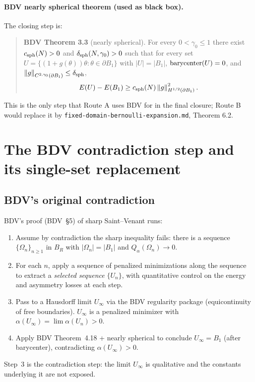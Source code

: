 \documentclass[11pt]{article}
\theoremstyle{definition}
\newcommand{\norm}[1]{\left\|#1\right\|}
\newcommand{\abs}[1]{\left|#1\right|}
\begin{document}
\paragraph{BDV nearly spherical theorem (used as black box).}
The closing step is:
\begin{quote}
\textbf{BDV Theorem 3.3} (nearly spherical). For every $0<\gamma_0\le1$
there exist $c_{\rm sph}(N)>0$ and $\delta_{\rm sph}(N,\gamma_0)>0$ such that for every set
$U=\{(1+g(\theta))\theta:\theta\in\partial B_1\}$ with
$\abs{U}=\abs{B_1}$, $\hbox{barycenter}(U)=0$, and
$\norm{g}_{C^{2,\gamma_0}(\partial B_1)}\le\delta_{\rm sph}$,
\[
E(U)-E(B_1)\ge c_{\rm sph}(N)\norm{g}_{H^{1/2}(\partial B_1)}^2.
\]
\end{quote}
This is the only step that Route A uses BDV for in the final closure; Route B
would replace it by \texttt{fixed-domain-bernoulli-expansion.md}, Theorem 6.2.

\section{The BDV contradiction step and its single-set replacement}

\subsection{BDV's original contradiction}

BDV's proof (BDV~\S 5) of sharp Saint--Venant runs:
\begin{enumerate}
\item Assume by contradiction the sharp inequality fails: there is a
sequence $\{\Omega_n\}_{n\ge1}$ in $B_R$ with $\abs{\Omega_n}=\abs{B_1}$ and
\(Q_\alpha(\Omega_n)\to 0\).
\item For each $n$, apply a sequence of penalized minimizations along the
sequence to extract a \emph{selected sequence} $\{U_n\}$, with quantitative
control on the energy and asymmetry losses at each step.
\item Pass to a Hausdorff limit $U_\infty$ via the BDV regularity package
(equicontinuity of free boundaries). $U_\infty$ is a penalized minimizer
with $\alpha(U_\infty)=\lim\alpha(U_n)>0$.
\item Apply BDV Theorem~4.18 + nearly spherical to conclude $U_\infty=B_1$
(after barycenter), contradicting $\alpha(U_\infty)>0$.
\end{enumerate}

Step~3 is the contradiction step: the limit $U_\infty$ is qualitative and
the constants underlying it are not exposed.
\end{document}
